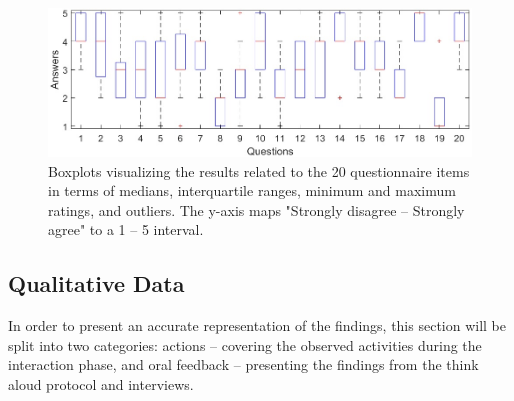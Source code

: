 \documentclass[dvipsnames, pdftex]{article}
\begin{document}
\begin{figure}[!t]
    \centering
    \includegraphics[width=1.0\textwidth]{SMC 2020 paper template LaTeX/figures/Boxplots.jpg}
    \caption{Boxplots visualizing the results related to the 20 questionnaire items in terms of medians, interquartile ranges, minimum and maximum ratings, and outliers. The y-axis maps "Strongly disagree -- Strongly agree" to a 1 -- 5 interval.}
    \label{fig:boxplots}
\end{figure}

\subsection{Qualitative Data}
In order to present an accurate representation of the findings, this section will be split into two categories: actions -- covering the observed activities during the interaction phase, and oral feedback -- presenting the findings from the think aloud protocol and interviews.
\end{document}
